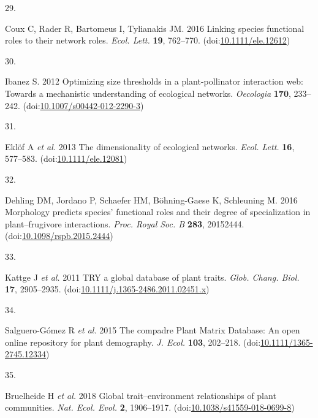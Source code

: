 \documentclass[
  12pt,
  a4paper,
]{article}
\newlength{\cslhangindent}
\newlength{\csllabelwidth}
\newlength{\cslentryspacingunit} %
\newenvironment{CSLReferences}[2] %
 {%
  \setlength{\parindent}{0pt}
  \ifodd #1
  \let\oldpar\par
  \def\par{\hangindent=\cslhangindent\oldpar}
  \fi
  \setlength{\parskip}{#2\cslentryspacingunit}
 }%
 {}
\newcommand{\CSLLeftMargin}[1]{\parbox[t]{\csllabelwidth}{#1}}
\newcommand{\CSLRightInline}[1]{\parbox[t]{\linewidth - \csllabelwidth}{#1}\break}
\begin{document}
\begin{CSLReferences}{0}{0}
\leavevmode{}%
\CSLLeftMargin{29. }
\CSLRightInline{Coux C, Rader R, Bartomeus I, Tylianakis JM. 2016 Linking species functional roles to their network roles. \emph{Ecol. Lett.} \textbf{19}, 762--770. (doi:\href{https://doi.org/10.1111/ele.12612}{10.1111/ele.12612})}

\leavevmode{}%
\CSLLeftMargin{30. }
\CSLRightInline{Ibanez S. 2012 Optimizing size thresholds in a plant-pollinator interaction web: Towards a mechanistic understanding of ecological networks. \emph{Oecologia} \textbf{170}, 233--242. (doi:\href{https://doi.org/10.1007/s00442-012-2290-3}{10.1007/s00442-012-2290-3})}

\leavevmode{}%
\CSLLeftMargin{31. }
\CSLRightInline{Eklöf A \emph{et al.} 2013 The dimensionality of ecological networks. \emph{Ecol. Lett.} \textbf{16}, 577--583. (doi:\href{https://doi.org/10.1111/ele.12081}{10.1111/ele.12081})}

\leavevmode{}%
\CSLLeftMargin{32. }
\CSLRightInline{Dehling DM, Jordano P, Schaefer HM, Böhning-Gaese K, Schleuning M. 2016 Morphology predicts species' functional roles and their degree of specialization in plant--frugivore interactions. \emph{Proc. Royal Soc. B} \textbf{283}, 20152444. (doi:\href{https://doi.org/10.1098/rspb.2015.2444}{10.1098/rspb.2015.2444})}

\leavevmode{}%
\CSLLeftMargin{33. }
\CSLRightInline{Kattge J \emph{et al.} 2011 {TRY} \textendash{} a global database of plant traits. \emph{Glob. Chang. Biol.} \textbf{17}, 2905--2935. (doi:\href{https://doi.org/10.1111/j.1365-2486.2011.02451.x}{10.1111/j.1365-2486.2011.02451.x})}

\leavevmode{}%
\CSLLeftMargin{34. }
\CSLRightInline{Salguero-Gómez R \emph{et al.} 2015 The compadre {Plant Matrix Database}: An open online repository for plant demography. \emph{J. Ecol.} \textbf{103}, 202--218. (doi:\href{https://doi.org/10.1111/1365-2745.12334}{10.1111/1365-2745.12334})}

\leavevmode{}%
\CSLLeftMargin{35. }
\CSLRightInline{Bruelheide H \emph{et al.} 2018 Global trait--environment relationships of plant communities. \emph{Nat. Ecol. Evol.} \textbf{2}, 1906--1917. (doi:\href{https://doi.org/10.1038/s41559-018-0699-8}{10.1038/s41559-018-0699-8})}


\end{CSLReferences}
\end{document}
